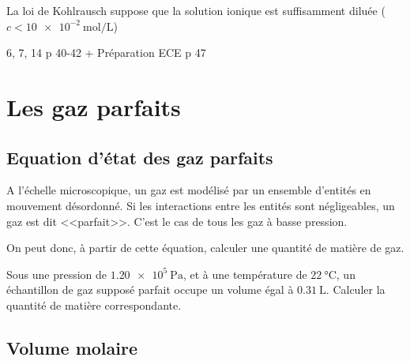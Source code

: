   La loi de Kohlrausch suppose que la solution ionique est suffisamment diluée ($c<\SI{10e-2}{\mole\per\liter}$) 


 6, 7, 14 p 40-42 +  Préparation ECE p 47

\section{Les gaz parfaits}

\subsection{Equation d'état des gaz parfaits}
A l'échelle microscopique, un gaz est modélisé par un ensemble d'entités en mouvement désordonné. Si les interactions entre les entités sont négligeables, un gaz est dit <<parfait>>.  C'est le cas de tous les gaz à basse pression.\\

On peut donc, à partir de cette équation, calculer une quantité de matière de gaz.

Sous une pression de $\SI{1,20e5}{\pascal}$, et à une température de $\SI{22}{\celsius}$, un échantillon de gaz supposé parfait occupe un volume égal à $\SI{0,31}{\liter}$. Calculer la quantité de matière correspondante.\\
\subsection{Volume molaire}

